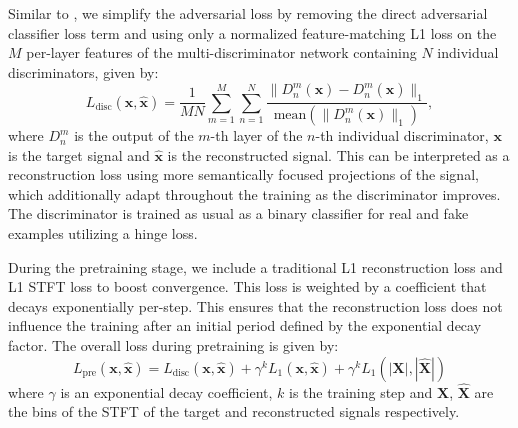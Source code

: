 \documentclass{article} %
\begin{document}
Similar to \cite{moshi}, we simplify the adversarial loss by removing the direct adversarial classifier loss term and using only a normalized feature-matching L1 loss on the $M$ per-layer features of the multi-discriminator network containing $N$ individual discriminators, given by:
\begin{equation}
\label{eq:feature-matching-disc}
\textit{L}_\text{disc}(\mathbf{x}, \hat{\mathbf{x}}) = \frac{1}{M N}\sum_{m = 1}^M\sum_{n = 1}^N \frac{\lVert D_n^m(\mathbf{x}) - D_n^m (\hat{\mathbf{x}})\rVert_1}{\text{mean}(\lVert D_n^m(\mathbf{x})\rVert_1)},
\end{equation}
where $D_n^m$ is the output of the $m$-th layer of the $n$-th individual discriminator, $\mathbf{x}$ is the target signal and $\hat{\mathbf{x}}$ is the reconstructed signal. This can be interpreted as a reconstruction loss using more semantically focused projections of the signal, which additionally adapt throughout the training as the discriminator improves. The discriminator is trained as usual as a binary classifier for real and fake examples utilizing a hinge loss.

During the pretraining stage, we include a traditional L1 reconstruction loss and L1 STFT loss to boost convergence. This loss is weighted by a coefficient that decays exponentially per-step. This ensures that the reconstruction loss does not influence the training after an initial period defined by the exponential decay factor. The overall loss during pretraining is given by:
\begin{equation}
\textit{L}_\text{pre}(\mathbf{x}, \hat{\mathbf{x}}) = \textit{L}_\text{disc}(\mathbf{x}, \hat{\mathbf{x}}) + \gamma^k \textit{L}_1(\mathbf{x}, \hat{\mathbf{x}}) + \gamma^k \textit{L}_1(|\mathbf{X}|, |\hat{\mathbf{X}}|)
\end{equation}
where $\gamma$ is an exponential decay coefficient, $k$ is the training step and $\mathbf{X}$, $\hat{\mathbf{X}}$ are the bins of the STFT of the target and reconstructed signals respectively.
\end{document}
